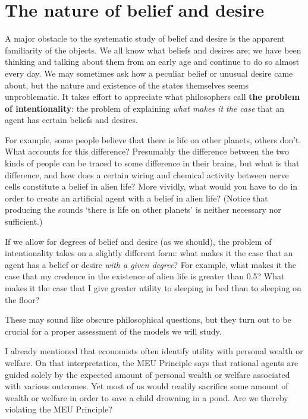 

\section{The nature of belief and desire}

A major obstacle to the systematic study of belief and desire is the
apparent familiarity of the objects. We all know what beliefs and
desires are; we have been thinking and talking about them from an
early age and continue to do so almost every day. We may sometimes ask
how a peculiar belief or unusual desire came about, but the nature and
existence of the states themselves seems unproblematic. It takes
effort to appreciate what philosophers call \textbf{the problem of
  intentionality}: the problem of explaining \emph{what makes it the
  case} that an agent has certain beliefs and desires. 

For example, some people believe that there is life on other planets,
others don't. What accounts for this difference? Presumably the
difference between the two kinds of people can be traced to some
difference in their brains, but what is that difference, and how does
a certain wiring and chemical activity between nerve cells constitute
a belief in alien life? More vividly, what would you have to do in
order to create an artificial agent with a belief in alien life?
(Notice that producing the sounds `there is life on other planets' is
neither necessary nor sufficient.)

If we allow for degrees of belief and desire (as we should), the
problem of intentionality takes on a slightly different form: what
makes it the case that an agent has a belief or desire \emph{with a
  given degree}? For example, what makes it the case that my credence
in the existence of alien life is greater than 0.5? What makes it the
case that I give greater utility to sleeping in bed than to sleeping
on the floor?

These may sound like obscure philosophical questions, but they turn
out to be crucial for a proper assessment of the models we will study.

I already mentioned that economists often identify utility with
personal wealth or welfare. On that interpretation, the MEU
Principle says that rational agents are guided solely by the expected
amount of personal wealth or welfare associated with various
outcomes. Yet most of us would readily sacrifice some amount of wealth
or welfare in order to save a child drowning in a pond. Are we
thereby violating the MEU Principle? 

